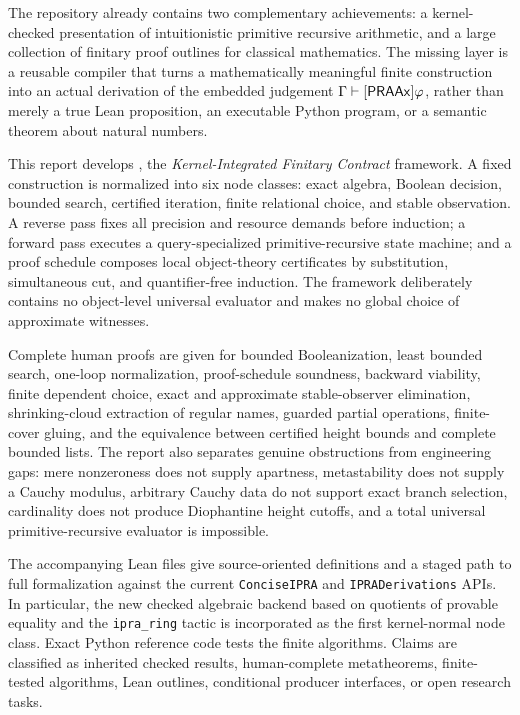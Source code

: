 The repository already contains two complementary achievements: a kernel-checked presentation of intuitionistic primitive recursive arithmetic, and a large collection of finitary proof outlines for classical mathematics.  The missing layer is a reusable compiler that turns a mathematically meaningful finite construction into an actual derivation of the embedded judgement \(\Gamma\vdash[\mathsf{PRAAx}]\varphi\), rather than merely a true Lean proposition, an executable Python program, or a semantic theorem about natural numbers.

This report develops \KIFC, the \emph{Kernel-Integrated Finitary Contract} framework.  A fixed construction is normalized into six node classes: exact algebra, Boolean decision, bounded search, certified iteration, finite relational choice, and stable observation.  A reverse pass fixes all precision and resource demands before induction; a forward pass executes a query-specialized primitive-recursive state machine; and a proof schedule composes local object-theory certificates by substitution, simultaneous cut, and quantifier-free induction.  The framework deliberately contains no object-level universal evaluator and makes no global choice of approximate witnesses.

Complete human proofs are given for bounded Booleanization, least bounded search, one-loop normalization, proof-schedule soundness, backward viability, finite dependent choice, exact and approximate stable-observer elimination, shrinking-cloud extraction of regular names, guarded partial operations, finite-cover gluing, and the equivalence between certified height bounds and complete bounded lists.  The report also separates genuine obstructions from engineering gaps: mere nonzeroness does not supply apartness, metastability does not supply a Cauchy modulus, arbitrary Cauchy data do not support exact branch selection, cardinality does not produce Diophantine height cutoffs, and a total universal primitive-recursive evaluator is impossible.

The accompanying Lean files give source-oriented definitions and a staged path to full formalization against the current \texttt{ConciseIPRA} and \texttt{IPRADerivations} APIs.  In particular, the new checked algebraic backend based on quotients of provable equality and the \texttt{ipra\_ring} tactic is incorporated as the first kernel-normal node class.  Exact Python reference code tests the finite algorithms.  Claims are classified as inherited checked results, human-complete metatheorems, finite-tested algorithms, Lean outlines, conditional producer interfaces, or open research tasks.
